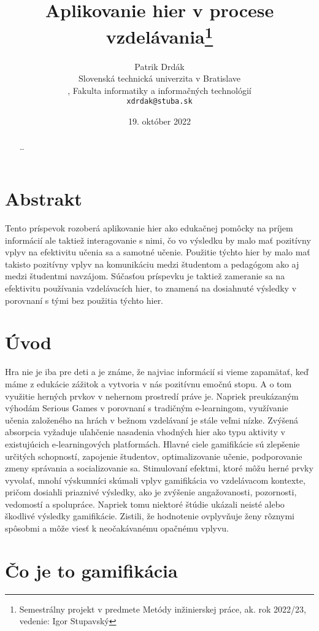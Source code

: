 \documentclass[10pt,twoside,slovak,a4paper]{article}
\title{Aplikovanie hier v procese vzdelávania\thanks{Semestrálny projekt v predmete Metódy inžinierskej práce, ak. rok 2022/23, vedenie: Igor Stupavský}} %
\author{Patrik Drdák\\[2pt]
	{\small Slovenská technická univerzita v Bratislave}\\,
	{\small Fakulta informatiky a informačných technológií}\\
	{\small \texttt{xdrdak@stuba.sk}}
	}
\date{\small 19. október 2022} %
\begin{document}
\maketitle

\begin{abstract}
\ldots
\end{abstract}

\section{Abstrakt}
Tento príspevok rozoberá aplikovanie hier
ako edukačnej pomôcky na príjem informácií ale taktiež interagovanie s nimi,
čo vo výsledku by malo mať pozitívny vplyv na efektivitu učenia sa a samotné
učenie. Použitie týchto hier by malo mať takisto pozitívny vplyv na komunikáciu medzi študentom a pedagógom ako aj medzi študentmi navzájom. Súčasťou príspevku je taktiež zameranie sa na efektivitu používania vzdelávacích hier, to znamená na dosiahnuté výsledky v porovnaní s tými bez použitia týchto hier.


\section{Úvod}

Hra nie je iba pre deti a je známe, že najviac informácií si vieme zapamätať, keď máme z edukácie zážitok a vytvoria v nás pozitívnu emočnú stopu. A o tom využitie herných prvkov v nehernom prostredí práve je. Napriek preukázaným výhodám Serious Games v porovnaní s tradičným e-learningom, využívanie učenia založeného na hrách
v bežnom vzdelávaní je stále veľmi nízke. Zvýšená absorpcia
vyžaduje uľahčenie nasadenia vhodných hier ako typu aktivity
v existujúcich e-learningových platformách. Hlavné ciele gamifikácie sú zlepšenie určitých schopností, zapojenie študentov, optimalizovanie učenie, podporovanie zmeny správania a socializovanie sa. Stimulovaní efektmi, ktoré môžu herné prvky vyvolať, mnohí výskumníci skúmali vplyv gamifikácia vo vzdelávacom kontexte, pričom dosiahli priaznivé výsledky, ako je zvýšenie angažovanosti, pozornosti, vedomostí a spolupráce. Napriek tomu niektoré štúdie ukázali neisté alebo škodlivé výsledky gamifikácie. Zistili, že hodnotenie ovplyvňuje ženy rôznymi spôsobmi a môže viesť k neočakávanému opačnému vplyvu.





\section{Čo je to gamifikácia} 
\end{document}
